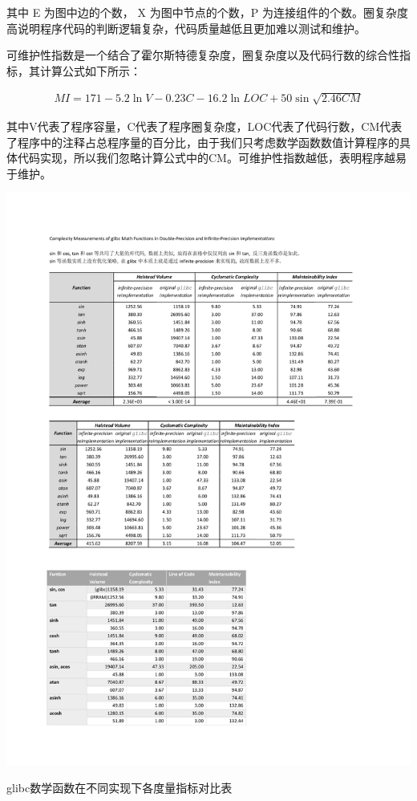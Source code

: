 其中 E 为图中边的个数， X 为图中节点的个数，P 为连接组件的个数。圈复杂度高说明程序代码的判断逻辑复杂，代码质量越低且更加难以测试和维护。

可维护性指数是一个结合了霍尔斯特德复杂度，圈复杂度以及代码行数的综合性指标，其计算公式如下所示：

\begin{align*}
    MI = 171 - 5.2\ln V - 0.23C - 16.2\ln LOC + 50\sin\sqrt{2.46CM}
\end{align*}

其中V代表了程序容量，C代表了程序圈复杂度，LOC代表了代码行数，CM代表了程序中的注释占总程序量的百分比，由于我们只考虑数学函数数值计算程序的具体代码实现，所以我们忽略计算公式中的CM。可维护性指数越低，表明程序越易于维护。

\begin{table}[thbp]
    \centering
    \includegraphics[width=\columnwidth]{fig/EvalTable_ComplexMeasurements.pdf}
    \caption{glibc数学函数在不同实现下各度量指标对比表} \label{fig:complex_measurements}
 \end{table}

